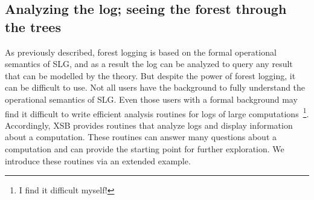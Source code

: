 
\subsection{Analyzing the log; seeing the forest through the trees} \label{sec:forest-log-anal}
%
As previously described, forest logging is based on the formal
operational semantics of SLG, and as a result the log can be analyzed
to query any result that can be modelled by the theory.  But despite
the power of forest logging, it can be difficult to use.  Not all
users have the background to fully understand the operational
semantics of SLG.  Even those users with a formal background may find
it difficult to write efficient analysis routines for logs of large
computations~\footnote{I find it difficult myself!}.  Accordingly, XSB
provides routines that analyze logs and display information about a
computation.  These routines can answer many questions about a
computation and can provide the starting point for further
exploration.  We introduce these routines via an extended example.


